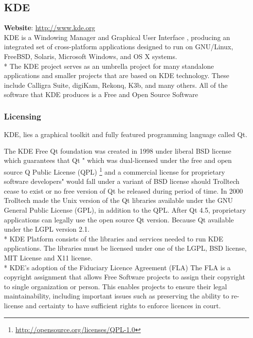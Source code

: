 \documentclass[11pt]{article} %
\begin{document}
\subsection{KDE} %

\textbf{Website}: \url {http://www.kde.org}\\

KDE is a Windowing Manager and Graphical User Interface , producing an integrated set of cross-platform applications designed to run on GNU/Linux, FreeBSD, Solaris, Microsoft Windows, and OS X systems.\\*
The KDE project serves as an umbrella project for many standalone applications and smaller projects that are based on KDE technology. These include Calligra Suite, digiKam, Rekonq, K3b, and many others.
All of the software that KDE produces is a Free and Open Source Software \\

\subsubsection{Licensing}

KDE, lies a graphical toolkit and fully featured programming language called Qt.

The KDE Free Qt foundation was created in 1998 under liberal BSD license which guarantees that Qt " which was dual-licensed under the free and open source Q Public License (QPL) \footnote {\url{http://opensource.org/licenses/QPL-1.0}}  and a commercial license for proprietary software developers" would fall under a variant of BSD license should Trolltech cease to exist or no free version of Qt be released during period of time.
 In 2000 Trolltech made the Unix version of the Qt libraries available under the GNU General Public License (GPL), in addition to the QPL.
After Qt 4.5, proprietary applications can legally use the open source Qt version.
Because Qt available under the LGPL version 2.1.\\*
 KDE Platform consists of the libraries and services needed to run KDE applications. The libraries must be licensed under one of the LGPL, BSD license, MIT License and X11 license.\\*
KDE's adoption of the Fiduciary Licence Agreement (FLA) The FLA is a copyright assignment that allows Free Software projects to assign their copyright to single organization or person. This enables projects to ensure their legal maintainability, including important issues such as preserving the ability to re-license and certainty to have sufficient rights to enforce licences in court.
\end{document}
